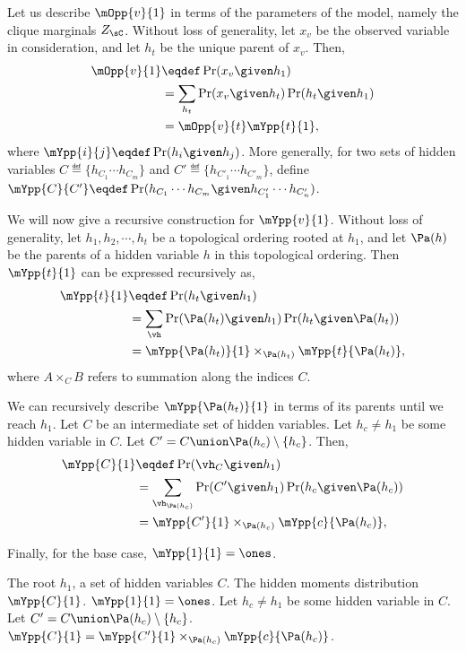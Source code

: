 Let us describe $\mOpp{v}{1}$ in terms of the parameters of the model,
  namely the clique marginals $Z_\sC$.
Without loss of generality, let $x_v$ be the observed variable in
  consideration, and let $h_t$ be the unique parent of $x_v$.
Then, 
\begin{align*}
  \mOpp{v}{1} &\eqdef \Pr( x_v \given h_1 )  \\
              &= \sum_{h_t} \Pr( x_v \given h_t ) \Pr( h_t \given h_1 ) \\
              &= \mOpp{v}{t} \mYpp{t}{1},
\end{align*}
where $\mYpp{i}{j} \eqdef \Pr( h_i \given h_j )$. More generally, for two sets of hidden variables $C \eqdef \{h_{C_1} \cdots h_{C_m} \}$ and $C' \eqdef \{h_{C'_1} \cdots h_{C'_m} \}$, define $\mYpp{C}{C'} \eqdef \Pr( h_{C_1} \cdots h_{C_m} \given h_{C'_1} \cdots h_{C'_n} )$. 
  
We will now give a recursive construction for $\mYpp{v}{1}$.
Without loss of generality, let $h_1, h_2, \cdots, h_t$ be a topological
  ordering rooted at $h_1$,
and let $\Pa(h)$ be the parents of a hidden variable $h$ in
  this topological ordering.
Then $\mYpp{t}{1}$ can be expressed recursively as,
\begin{align*}
  \mYpp{t}{1} &\eqdef \Pr( h_t \given h_1 )  \\
  &= \sum_{\vh} \Pr( \Pa(h_t) \given h_1 ) \Pr( h_t \given \Pa(h_t) ) \\
  &= \mYpp{ \Pa(h_t) }{1} \times_{\Pa(h_t)} \mYpp{t}{\Pa(h_t)},
\end{align*}
where $A \times_{C} B$ refers to summation along the indices $C$.

We can recursively describe $\mYpp{ \Pa(h_t) }{1}$ in terms of its
  parents until we reach $h_1$.
Let $C$ be an intermediate set of hidden variables. Let $h_c \neq h_1$
  be some hidden variable in $C$. 
Let $C' = C \union \Pa(h_c) \setminus \{h_c\}$.
Then,
\begin{align*}
  \mYpp{C}{1} &\eqdef \Pr( \vh_C \given h_1 )  \\
  &= \sum_{\vh_{\Pa(h_c)}} \Pr( C' \given h_1 ) \Pr( h_c \given \Pa(h_c) ) \\
  &= \mYpp{ C' }{ 1 } \times_{\Pa(h_c)} \mYpp{c}{\Pa(h_c)},
\end{align*}

Finally, for the base case, $\mYpp{1}{1} = \ones$.
  
\begin{algorithm}
  \caption{$\mYpp{C}{1}$}
  \label{algo:Y}
  \begin{algorithmic}
    \REQUIRE The root $h_1$, a set of hidden variables $C$.
    \ENSURE The hidden moments distribution $\mYpp{C}{1}$.
      \STATE $\mYpp{1}{1} = \ones$.
    \ELSE
      \STATE Let $h_c \neq h_1$ be some hidden variable in $C$.
      \STATE Let $C' = C \union \Pa(h_c) \setminus \{h_c\}$.
      \STATE $\mYpp{C}{1} = \mYpp{C'}{1} \times_{\Pa(h_c)} \mYpp{c}{\Pa(h_c)}$.
    \ENDIF
  \end{algorithmic}
\end{algorithm}

